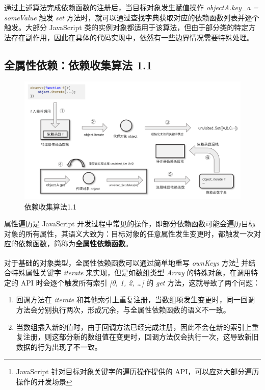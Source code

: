 \documentclass[winfonts,master,twoside]{njuthesis}
\begin{document}
通过上述算法完成依赖函数的注册后，当目标对象发生赋值操作 \textit{objectA.key\_a = someValue} 触发 \textit{set} 方法时，就可以通过查找字典获取对应的依赖函数列表并逐个触发。大部分 JavaScript 类的实例对象都适用于该算法，但由于部分类的特定方法存在副作用，因此在具体的代码实现中，依然有一些边界情况需要特殊处理。

\subsection{全属性依赖：依赖收集算法 1.1}

\begin{figure}[h]
    \centering
    \includegraphics[width=\textwidth]{figure/chapter-3/algorithm1.1-update.png}
    \caption{依赖收集算法1.1}
    \label{algorithm-1.1}
\end{figure}

属性遍历是 JavaScript 开发过程中常见的操作，即部分依赖函数可能会遍历目标对象的所有属性，其语义大致为：目标对象的任意属性发生变更时，都触发一次对应的依赖函数，简称为\textbf{全属性依赖函数}。

对于基础的对象类型，全属性依赖函数可以通过简单地重写 \textit{ownKeys} 方法\footnote{JavaScript 针对目标对象关键字的遍历操作提供的 API，可以应对大部分遍历操作的开发场景}
并结合特殊属性关键字 \textit{iterate} 来实现，但是如数组类型 \textit{Array} 的特殊对象，在调用特定的 API 时会逐个触发所有索引 \textit{[0, 1, 2, \dots]} 的 \textit{get} 方法，这就导致了两个问题：

\begin{enumerate}
    \item 回调方法在 \textit{iterate} 和其他索引上重复注册，当数组项发生变更时，同一回调方法会分别执行两次，形成冗余，与全属性依赖函数的语义不一致。
    \item 当数组插入新的值时，由于回调方法已经完成注册，因此不会在新的索引上重复注册，则这部分新的数组值在变更时，回调方法仅会执行一次，这导致新旧数据的行为出现了不一致。
\end{enumerate}
\end{document}
